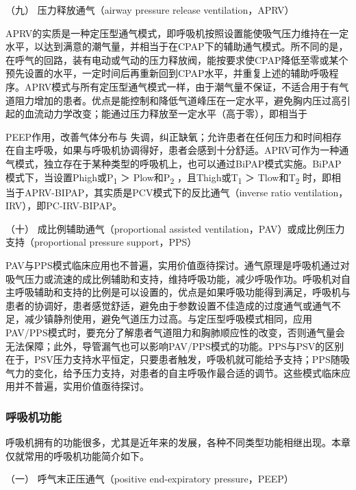 \hypertarget{text00368.htmlux5cux23CHP16-3-2-1-9}{}
（九） 压力释放通气（airway pressure release ventilation，APRV）

APRV的实质是一种定压型通气模式，即呼吸机按照设置能使吸气压力维持在一定水平，以达到满意的潮气量，并相当于在CPAP下的辅助通气模式。所不同的是，在呼气的回路，装有电动或气动的压力释放阀，能按要求使CPAP降低至零或某个预先设置的水平，一定时间后再重新回到CPAP水平，并重复上述的辅助呼吸程序。APRV模式与所有定压型通气模式一样，由于潮气量不保证，不适合用于有气道阻力增加的患者。优点是能控制和降低气道峰压在一定水平，避免胸内压过高引起的血流动力学改变；能通过压力释放至一定水平（高于零），即相当于

PEEP作用，改善气体分布与{}
失调，纠正缺氧；允许患者在任何压力和时间相存在自主呼吸，如果与呼吸机协调得好，患者会感到十分舒适。APRV可作为一种通气模式，独立存在于某种类型的呼吸机上，也可以通过BiPAP模式实施。BiPAP模式下，当设置Phigh或P\textsubscript{1}
＞ Plow和P\textsubscript{2} ，且Thigh或T\textsubscript{1} ＞
Tlow和T\textsubscript{2}
时，即相当于APRV-BIPAP，其实质是PCV模式下的反比通气（inverse ratio
ventilation，IRV），即PC-IRV-BIPAP。

\hypertarget{text00368.htmlux5cux23CHP16-3-2-1-10}{}
（十） 成比例辅助通气（proportional assisted
ventilation，PAV）或成比例压力支持（proportional pressure support，PPS）

PAV与PPS模式临床应用也不普遍，实用价值亟待探讨。通气原理是呼吸机通过对吸气压力或流速的成比例辅助和支持，维持呼吸功能，减少呼吸作功。呼吸机对自主呼吸辅助和支持的比例是可以设置的，优点是如果呼吸功能得到满足，呼吸机与患者的协调好，患者感觉舒适，避免由于参数设置不佳造成的过度通气或通气不足，减少镇静剂使用，避免气道压力过高。与定压型呼吸模式相同，应用PAV/PPS模式时，要充分了解患者气道阻力和胸肺顺应性的改变，否则通气量会无法保障；此外，导管漏气也可以影响PAV/PPS模式的功能。PPS与PSV的区别在于，PSV压力支持水平恒定，只要患者触发，呼吸机就可能给予支持；PPS随吸气力的变化，给予压力支持，对患者的自主呼吸作最合适的调节。这些模式临床应用并不普遍，实用价值亟待探讨。

\subsubsection{呼吸机功能}

呼吸机拥有的功能很多，尤其是近年来的发展，各种不同类型功能相继出现。本章仅就常用的呼吸机功能简介如下。

\hypertarget{text00368.htmlux5cux23CHP16-3-2-2-1}{}
（一） 呼气末正压通气（positive end-expiratory pressure，PEEP）

